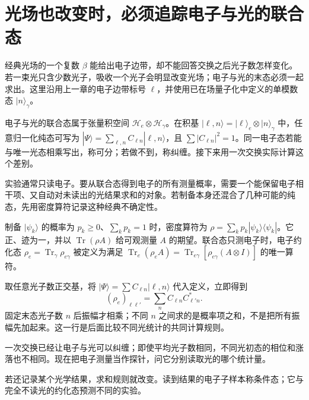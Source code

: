 \chapter{光场也改变时，必须追踪电子与光的联合态}
\label{chap:feqo-quantum-exchange}

经典光场的一个复数 \(\beta\) 能给出电子边带，却不能回答交换之后光子数怎样变化。若一束光只含少数光子，吸收一个光子会明显改变光场；电子与光的末态必须一起求出。这里沿用上一章的电子边带标号 \(\ell\)，并使用已在场量子化中定义的单模数态 \(|n\rangle_\gamma\)。

电子与光的联合态属于张量积空间 \(\mathcal H_e\otimes\mathcal H_\gamma\)。在积基 \(|\ell,n\rangle=|\ell\rangle_e\otimes|n\rangle_\gamma\) 中，任意归一化纯态可写为 \(|\Psi\rangle=\sum_{\ell,n}C_{\ell n}|\ell,n\rangle\)，且 \(\sum|C_{\ell n}|^2=1\)。同一电子态若能与唯一光态相乘写出，称可分；若做不到，称纠缠。接下来用一次交换实际计算这个差别。

实验通常只读电子。要从联合态得到电子的所有测量概率，需要一个能保留电子相干项、又自动对未读出的光结果求和的对象。若制备本身还混合了几种可能的纯态，先用密度算符记录这种经典不确定性。

\begin{definition}[密度算符与偏迹]
制备 \(|\psi_k\rangle\) 的概率为 \(p_k\geq0\)、\(\sum_kp_k=1\) 时，密度算符为 \(\rho=\sum_kp_k|\psi_k\rangle\langle\psi_k|\)。它正、迹为一，并以 \(\operatorname{Tr}(\rho A)\) 给可观测量 \(A\) 的期望。联合态只测电子时，电子约化态 \(\rho_e=\operatorname{Tr}_\gamma\rho_{e\gamma}\) 被定义为满足
\(\operatorname{Tr}_e(\rho_e A)=\operatorname{Tr}_{e\gamma}[\rho_{e\gamma}(A\otimes I)]\) 的唯一算符。
\end{definition}

取任意光子数正交基，将 \(|\Psi\rangle=\sum C_{\ell n}|\ell,n\rangle\) 代入定义，立即得到
\begin{equation}
(\rho_e)_{\ell\ell'}=\sum_n C_{\ell n}C_{\ell'n}^*.
\label{eq:feqo-partial-trace-components}
\end{equation}
固定末态光子数 \(n\) 后振幅才相乘；不同 \(n\) 之间求的是概率项之和，不是把所有振幅先加起来。这一行是后面比较不同光统计的共同计算规则。



一次交换已经让电子与光可以纠缠；即使平均光子数相同，不同光初态的相位和涨落也不相同。现在把电子测量当作探针，问它分别读取光的哪个统计量。



若还记录某个光学结果，求和规则就改变。读到结果的电子子样本称条件态；它与完全不读光的约化态预测不同的实验。


